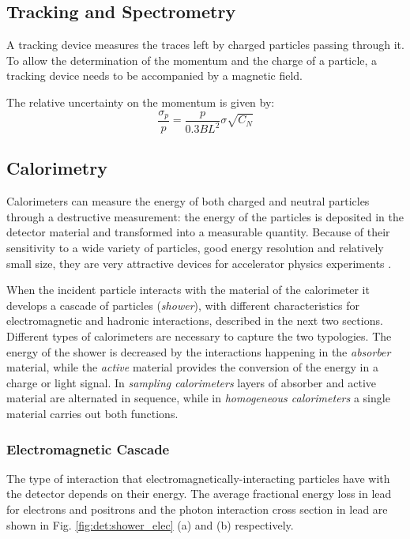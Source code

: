 \subsection{Tracking and Spectrometry}
\label{sec:dec:tracking}
A tracking device measures the traces left by charged particles passing through it. To allow the determination of the momentum and the charge of a particle, a tracking device needs to be accompanied by a magnetic field. 

The relative uncertainty on the momentum is given by:
\begin{equation}
\frac{\sigma_p}{p} = \frac{p}{0.3 B L^2}\sigma \sqrt{C_N}
\end{equation}


\subsection{Calorimetry}
\label{sec:dec:calo}

Calorimeters can measure the energy of both charged and neutral particles through a destructive measurement: the energy of the particles is deposited in the detector material and transformed into a measurable quantity. Because of their sensitivity to a wide variety of particles, good energy resolution and relatively small size, they are very attractive devices for accelerator physics experiments \cite{RevModPhys.75.1243} \cite{Wigmans:2000vf}.

When the incident particle interacts with the material of the calorimeter it develops a cascade of particles (\textit{shower}), with different characteristics for electromagnetic and hadronic interactions, described in the next two sections. Different types of calorimeters are necessary to capture the two typologies. The energy of the shower is decreased by the interactions happening in the \textit{absorber} material, while the \textit{active} material provides the conversion of the energy in a charge or light signal. In \textit{sampling calorimeters} layers of absorber and active material are alternated in sequence, while in \textit{homogeneous calorimeters} a single material carries out both functions.


\subsubsection{Electromagnetic Cascade}

The type of interaction that electromagnetically-interacting particles have with the detector depends on their energy. The average fractional energy loss in lead for electrons and positrons and the photon interaction cross section in lead are shown in Fig. \ref{fig:det:shower_elec} (a) and (b) respectively. 

